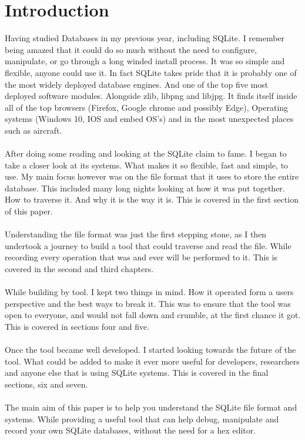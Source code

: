 \section*{Introduction}
\label{sec:introduction}

Having studied Databases in my previous year, including SQLite. I remember being amazed that it could do so much without the need to configure, manipulate, or go through a long winded install process. It was so simple and flexible, anyone could use it. In fact SQLite takes pride that it is probably one of the most widely deployed database engines. And one of the top five most deployed software modules. Alongside zlib, libpng and libjpg. It finds itself inside all of the top browsers (Firefox, Google chrome and possibly Edge), Operating systems (Windows 10, IOS and embed OS's) and in the most unexpected places such as aircraft.
\\\\
After doing some reading and looking at the SQLite claim to fame. I began to take a closer look at its systems. What makes it so flexible, fast and simple, to use. My main focus however was on the file format that it uses to store the entire database. This included many long nights looking at how it was put together. How to traverse it. And why it is the way it is. This is covered in the first section of this paper.
\\\\
Understanding the file format was just the first stepping stone, as I then undertook a journey to build a tool that could traverse and read the file. While recording every operation that was and ever will be performed to it. This is covered in the second and third chapters.
\\\\
While building by tool. I kept two things in mind. How it operated form a users perspective and the best ways to break it. This was to ensure that the tool was open to everyone, and would not fall down and crumble, at the first chance it got. This is covered in sections four and five. 
\\\\
Once the tool became well developed. I started looking towards the future of the tool. What could be added to make it ever more useful for developers, researchers and anyone else that is using SQLite systems. This is covered in the final sections, six and seven.
\\\\
The main aim of this paper is to help you understand the SQLite file format and systems. While providing a useful tool that can help debug, manipulate and record your own SQLite databases, without the need for a hex editor.